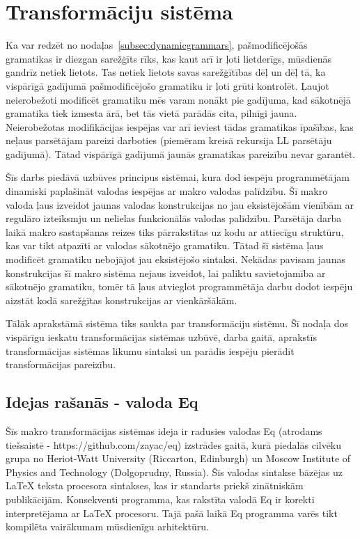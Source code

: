 \section{Transformāciju sistēma}
Ka var redzēt no nodaļas~\ref{subsec:dynamicgrammars}, pašmodificējošās gramatikas ir diezgan sarežģīts rīks, kas kaut arī ir ļoti lietderīgs, mūsdienās gandrīz netiek lietots. Tas netiek lietots savas sarežģītības dēļ un dēļ tā, ka vispārīgā gadījumā pašmodificējošo gramatiku ir ļoti grūti kontrolēt. Ļaujot neierobežoti modificēt gramatiku mēs varam nonākt pie gadījuma, kad sākotnējā gramatika tiek izmesta ārā, bet tās vietā parādās cita, pilnīgi jauna. Neierobežotas modifikācijas iespējas var arī ieviest tādas gramatikas īpašības, kas neļaus parsētājam pareizi darboties (piemēram kreisā rekursija LL parsētāju gadījumā). Tātad vispārīgā gadījumā jaunās gramatikas pareizību nevar garantēt.

Šīs darbs piedāvā uzbūves principus sistēmai, kura dod iespēju programmētājam dinamiski paplašināt valodas iespējas ar makro valodas palīdzību. Šī makro valoda ļaus izveidot jaunas valodas konstrukcijas no jau eksistējošām vienībām ar regulāro izteiksmju un nelielas funkcionālās valodas palīdzību. Parsētāja darba laikā makro sastapšanas reizes tiks pārrakstītas uz kodu ar attiecīgu struktūru, kas var tikt atpazīti ar valodas sākotnējo gramatiku. Tātad šī sistēma ļaus modificēt gramatiku nebojājot jau eksistējošo sintaksi. Nekādas pavisam jaunas konstrukcijas šī makro sistēma nejaus izveidot, lai paliktu savietojamība ar sākotnējo gramatiku, tomēr tā ļaus atvieglot programmētāja darbu dodot iespēju aizstāt kodā sarežģītas konstrukcijas ar vienkāršākām. 

Tālāk aprakstāmā sistēma tiks saukta par transformāciju sistēmu. Šī nodaļa dos vispārīgu ieskatu transformācijas sistēmas uzbūvē, darba gaitā, aprakstīs transformācijas sistēmas likumu sintaksi un parādīs iespēju pierādīt transformācijas pareizību.

\subsection{Idejas rašanās - valoda Eq}
Šīs makro transformācijas sistēmas ideja ir radusies valodas Eq (atrodams tiešsaistē - https://github.com/zayac/eq) izstrādes gaitā, kurā piedalās cilvēku grupa no Heriot-Watt University (Riccarton, Edinburgh) un Moscow Institute of Physics and Technology (Dolgoprudny, Russia). Šīs valodas sintakse bāzējas uz \LaTeX{} teksta procesora sintakses, kas ir standarts priekš zinātniskām publikācijām. Konsekventi programma, kas rakstīta valodā Eq ir korekti interpretējama ar \LaTeX{} procesoru. Tajā pašā laikā Eq programma varēs tikt kompilēta vairākumam mūsdienīgu arhitektūru. 

